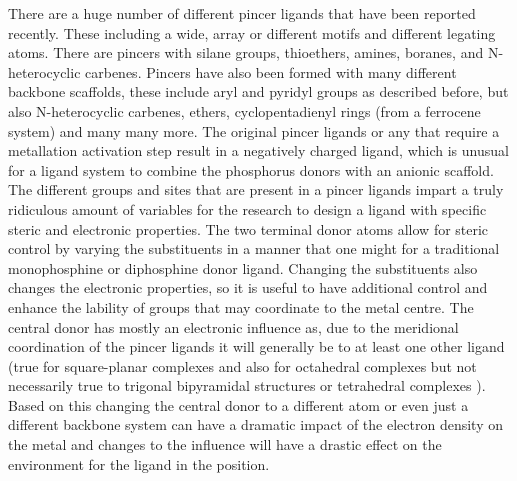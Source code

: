 There are a huge number of different pincer ligands that have been reported recently.  These including a wide, array or different motifs and different legating atoms.  There are pincers with silane groups, thioethers, amines, boranes, and N-heterocyclic carbenes.  Pincers have also been formed with many different backbone scaffolds, these include aryl and pyridyl groups as described before, but also N-heterocyclic carbenes, ethers, cyclopentadienyl rings (from a ferrocene system) and many many more.  The original pincer ligands or any that require a metallation activation step result in a negatively charged ligand, which is unusual for a ligand system to combine the phosphorus donors with an anionic scaffold.  The different groups and sites that are present in a pincer ligands impart a truly ridiculous amount of variables for the research to design a ligand with specific steric and electronic properties.  The two terminal donor atoms allow for steric control by varying the substituents in a manner that one might for a traditional monophosphine or diphosphine donor ligand.  Changing the substituents also changes the electronic properties, so it is useful to have additional control and enhance the lability of groups that may coordinate to the metal centre.  The central donor has mostly an electronic influence as, due to the meridional coordination of the pincer ligands it will generally be \trans{} to at least one other ligand (true for square-planar complexes and also for octahedral complexes but not necessarily true to trigonal bipyramidal structures or tetrahedral complexes ).  Based on this changing the central donor to a different atom or even just a different backbone system can have a dramatic impact of the electron density on the metal and changes to the \trans{} influence will have a drastic effect on the environment for the ligand in the \trans{} position.  


